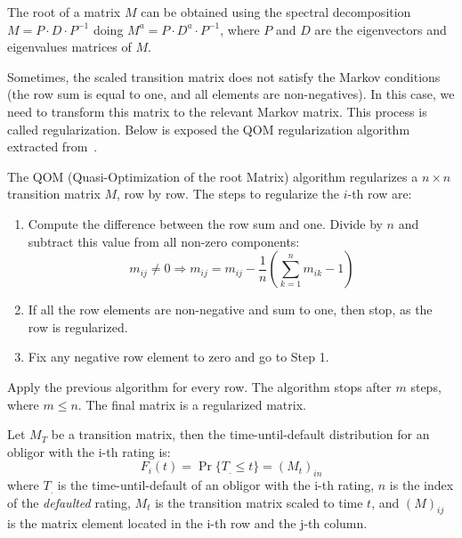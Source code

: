 \documentclass[11pt,fleqn]{book} %
\begin{document}
The root of a matrix $M$ can be obtained using the spectral decomposition
$M = P \cdot D \cdot P^{-1}$ doing 
$M^{a} = P \cdot D^{a} \cdot P^{-1}$, where $P$ and $D$ are the eigenvectors 
and eigenvalues matrices of $M$. 

Sometimes, the scaled transition matrix does not satisfy the Markov conditions
(the row sum is equal to one, and all elements are non-negatives). In this case, 
we need to transform this matrix to the relevant Markov matrix. This process is 
called regularization. Below is exposed the QOM regularization algorithm 
extracted from~\cite{kreinin:2001}.

\begin{algorithm}
	The QOM (Quasi-Optimization of the root Matrix) algorithm regularizes a 
	$n {\times} n$ transition matrix $M$, row by row. The steps to 
	regularize the $i$-th row are:
	\begin{enumerate}
		\item Compute the difference between the row sum and one. 
		Divide by $n$ and subtract this value from all non-zero components:
		\begin{displaymath}
			m_{ij} \ne 0 
			\Longrightarrow 
			m_{ij} = m_{ij} - \frac{1}{n} \left( \sum_{k=1}^{n} m_{ik} - 1\right)
		\end{displaymath}
		\item If all the row elements are non-negative and sum to one, 
		then stop, as the row is regularized.
		\item Fix any negative row element to zero and go to Step 1.
	\end{enumerate}
	
	Apply the previous algorithm for every row. The algorithm stops after $m$ 
	steps, where $m \le n$. The final matrix is a regularized matrix. 
\end{algorithm}

\begin{proposition}
	\label{prop:pdftm}
	Let $M_T$ be a transition matrix, then the time-until-default distribution 
	for an obligor with the i-th rating is:
	\begin{displaymath}
		F_i(t) = \Pr\{T_. \le t\} = \left( M_t \right)_{in}
	\end{displaymath}
	where $T_.$ is the time-until-default of an obligor with the i-th rating, 
	$n$ is the index of the \emph{defaulted} rating, $M_t$ is the transition 
	matrix scaled to time $t$, and $(M)_{ij}$ is the matrix element located in 
	the i-th row and the j-th column.
\end{proposition}
\end{document}
